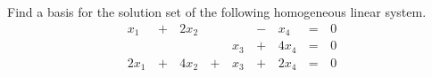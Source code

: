 \begin{applicationActivities}{3}{6}
\begin{activity}{10}
  Find a basis for the solution set of the following homogeneous linear
  system.
  \begin{alignat*}{5}
    x_1 &\,+\,& 2x_2 &\, \,&     &\,-\,&  x_4 &\,=\,& 0 \\
        &\, \,&      &\, \,& x_3 &\,+\,& 4x_4 &\,=\,& 0 \\
   2x_1 &\,+\,& 4x_2 &\,+\,& x_3 &\,+\,& 2x_4 &\,=\,& 0 \\
  \end{alignat*}
\end{activity}




\end{applicationActivities}
